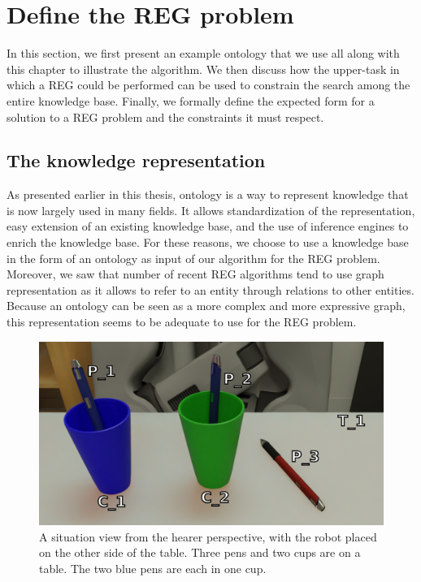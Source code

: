 \section{Define the REG problem}

In this section, we first present an example ontology that we use all along with this chapter to illustrate the algorithm. We then discuss how the upper-task in which a REG could be performed can be used to constrain the search among the entire knowledge base. Finally, we formally define the expected form for a solution to a REG problem and the constraints it must respect.


\subsection{The knowledge representation}
\label{sec:chap4_kb}

As presented earlier in this thesis, ontology is a way to represent knowledge that is now largely used in many fields. It allows standardization of the representation, easy extension of an existing knowledge base, and the use of inference engines to enrich the knowledge base. For these reasons, we choose to use a knowledge base in the form of an ontology as input of our algorithm for the REG problem. Moreover, we saw that number of recent REG algorithms tend to use graph representation as it allows to refer to an entity through relations to other entities. Because an ontology can be seen as a more complex and more expressive graph, this representation seems to be adequate to use for the REG problem. 

\begin{figure}[h!]
\centering
\includegraphics[scale=0.2]{figures/chapter4/pens.png}
\caption{\label{fig:chap4_kb} A situation view from the hearer perspective, with the robot placed on the other side of the table. Three pens and two cups are on a table. The two blue pens are each in one cup. }
\end{figure}

